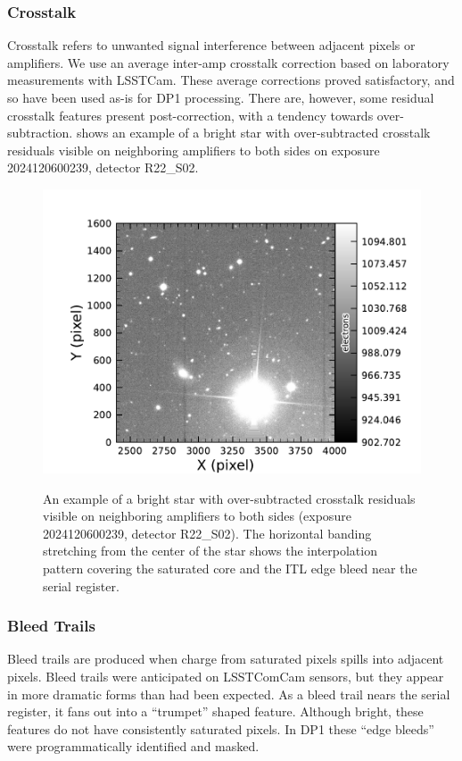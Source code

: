 \subsubsection{Crosstalk}
Crosstalk refers to unwanted signal interference between adjacent pixels or amplifiers.
We use an average inter-amp crosstalk correction based on laboratory measurements with LSSTCam.
These average corrections proved satisfactory, and so have been used as-is for DP1 processing.
There are, however, some residual crosstalk features present post-correction, with a tendency towards over-subtraction.
 shows an example  of a bright star with over-subtracted crosstalk residuals visible on neighboring amplifiers to both sides on exposure 2024120600239, detector R22\_S02.
\begin{figure}[htb!]
  \centering
  \includegraphics[width=0.98\linewidth]{figures/dp1_isr_anomalies-crosstalk_residual.pdf}
  \label{fig:crosstalk_residual}
  \caption{
    An example of a bright star with over-subtracted crosstalk residuals visible on neighboring amplifiers to both sides (exposure 2024120600239, detector R22\_S02).
    The horizontal banding stretching from the center of the star shows the interpolation pattern covering the saturated core and the ITL edge bleed near the serial register.
  }
\end{figure}

\subsubsection{Bleed Trails}
Bleed trails are produced when charge from saturated pixels spills into adjacent pixels.
Bleed trails were anticipated on LSSTComCam sensors, but they appear in more dramatic forms than had been expected.
As a bleed trail nears the serial register, it fans out into a ``trumpet'' shaped feature.
Although bright, these features do not have consistently saturated pixels.
In DP1 these ``edge bleeds'' were programmatically identified and masked.

